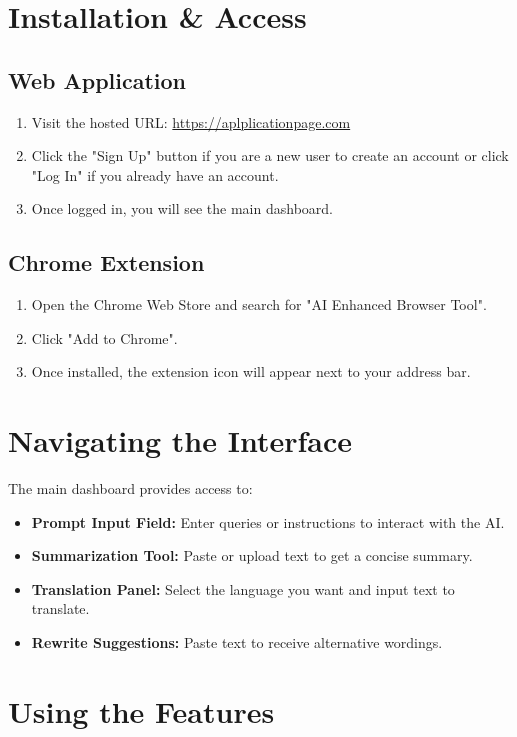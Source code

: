 \documentclass{article}
\begin{document}
\section{Installation \& Access}
\subsection{Web Application}
\begin{enumerate}
    \item Visit the hosted URL: \url{https://aplplicationpage.com}
    \item Click the "Sign Up" button if you are a new user to create an account or click "Log In" if you already have an account.
    \item Once logged in, you will see the main dashboard.
\end{enumerate}

\subsection{Chrome Extension}
\begin{enumerate}
    \item Open the Chrome Web Store and search for "AI Enhanced Browser Tool".
    \item Click "Add to Chrome".
    \item Once installed, the extension icon will appear next to your address bar.
\end{enumerate}

\section{Navigating the Interface}
The main dashboard provides access to:
\begin{itemize}
    \item \textbf{Prompt Input Field:} Enter queries or instructions to interact with the AI.
    \item \textbf{Summarization Tool:} Paste or upload text to get a concise summary.
    \item \textbf{Translation Panel:} Select the language you want and input text to translate.
    \item \textbf{Rewrite Suggestions:} Paste text to receive alternative wordings.
\end{itemize}

\section{Using the Features}
\end{document}
